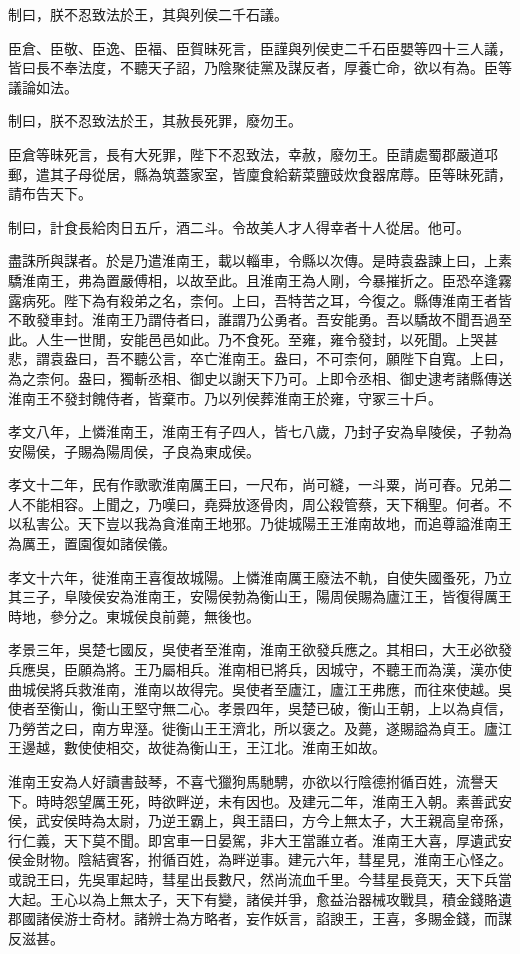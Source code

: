 制曰，朕不忍致法於王，其與列侯二千石議。

臣倉、臣敬、臣逸、臣福、臣賀昧死言，臣謹與列侯吏二千石臣嬰等四十三人議，皆曰長不奉法度，不聽天子詔，乃陰聚徒黨及謀反者，厚養亡命，欲以有為。臣等議論如法。

制曰，朕不忍致法於王，其赦長死罪，廢勿王。

臣倉等昧死言，長有大死罪，陛下不忍致法，幸赦，廢勿王。臣請處蜀郡嚴道邛郵，遣其子母從居，縣為筑蓋家室，皆廩食給薪菜鹽豉炊食器席蓐。臣等昧死請，請布告天下。

制曰，計食長給肉日五斤，酒二斗。令故美人才人得幸者十人從居。他可。

盡誅所與謀者。於是乃遣淮南王，載以輜車，令縣以次傳。是時袁盎諫上曰，上素驕淮南王，弗為置嚴傅相，以故至此。且淮南王為人剛，今暴摧折之。臣恐卒逢霧露病死。陛下為有殺弟之名，柰何。上曰，吾特苦之耳，今復之。縣傳淮南王者皆不敢發車封。淮南王乃謂侍者曰，誰謂乃公勇者。吾安能勇。吾以驕故不聞吾過至此。人生一世閒，安能邑邑如此。乃不食死。至雍，雍令發封，以死聞。上哭甚悲，謂袁盎曰，吾不聽公言，卒亡淮南王。盎曰，不可柰何，願陛下自寬。上曰，為之柰何。盎曰，獨斬丞相、御史以謝天下乃可。上即令丞相、御史逮考諸縣傳送淮南王不發封餽侍者，皆棄市。乃以列侯葬淮南王於雍，守冢三十戶。

孝文八年，上憐淮南王，淮南王有子四人，皆七八歲，乃封子安為阜陵侯，子勃為安陽侯，子賜為陽周侯，子良為東成侯。

孝文十二年，民有作歌歌淮南厲王曰，一尺布，尚可縫，一斗粟，尚可舂。兄弟二人不能相容。上聞之，乃嘆曰，堯舜放逐骨肉，周公殺管蔡，天下稱聖。何者。不以私害公。天下豈以我為貪淮南王地邪。乃徙城陽王王淮南故地，而追尊謚淮南王為厲王，置園復如諸侯儀。

孝文十六年，徙淮南王喜復故城陽。上憐淮南厲王廢法不軌，自使失國蚤死，乃立其三子，阜陵侯安為淮南王，安陽侯勃為衡山王，陽周侯賜為廬江王，皆復得厲王時地，參分之。東城侯良前薨，無後也。

孝景三年，吳楚七國反，吳使者至淮南，淮南王欲發兵應之。其相曰，大王必欲發兵應吳，臣願為將。王乃屬相兵。淮南相已將兵，因城守，不聽王而為漢，漢亦使曲城侯將兵救淮南，淮南以故得完。吳使者至廬江，廬江王弗應，而往來使越。吳使者至衡山，衡山王堅守無二心。孝景四年，吳楚已破，衡山王朝，上以為貞信，乃勞苦之曰，南方卑溼。徙衡山王王濟北，所以褒之。及薨，遂賜謚為貞王。廬江王邊越，數使使相交，故徙為衡山王，王江北。淮南王如故。

淮南王安為人好讀書鼓琴，不喜弋獵狗馬馳騁，亦欲以行陰德拊循百姓，流譽天下。時時怨望厲王死，時欲畔逆，未有因也。及建元二年，淮南王入朝。素善武安侯，武安侯時為太尉，乃逆王霸上，與王語曰，方今上無太子，大王親高皇帝孫，行仁義，天下莫不聞。即宮車一日晏駕，非大王當誰立者。淮南王大喜，厚遺武安侯金財物。陰結賓客，拊循百姓，為畔逆事。建元六年，彗星見，淮南王心怪之。或說王曰，先吳軍起時，彗星出長數尺，然尚流血千里。今彗星長竟天，天下兵當大起。王心以為上無太子，天下有變，諸侯并爭，愈益治器械攻戰具，積金錢賂遺郡國諸侯游士奇材。諸辨士為方略者，妄作妖言，諂諛王，王喜，多賜金錢，而謀反滋甚。


